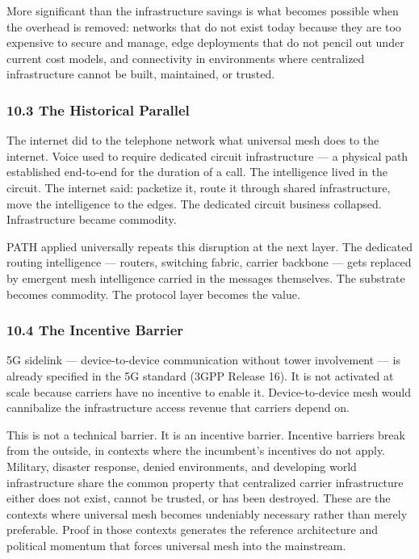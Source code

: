 \documentclass[
  11pt,
]{article}
\begin{document}
More significant than the infrastructure savings is what becomes
possible when the overhead is removed: networks that do not exist today
because they are too expensive to secure and manage, edge deployments
that do not pencil out under current cost models, and connectivity in
environments where centralized infrastructure cannot be built,
maintained, or trusted.

\hypertarget{the-historical-parallel}{%
\subsubsection{10.3 The Historical
Parallel}\label{the-historical-parallel}}

The internet did to the telephone network what universal mesh does to
the internet. Voice used to require dedicated circuit infrastructure ---
a physical path established end-to-end for the duration of a call. The
intelligence lived in the circuit. The internet said: packetize it,
route it through shared infrastructure, move the intelligence to the
edges. The dedicated circuit business collapsed. Infrastructure became
commodity.

PATH applied universally repeats this disruption at the next layer. The
dedicated routing intelligence --- routers, switching fabric, carrier
backbone --- gets replaced by emergent mesh intelligence carried in the
messages themselves. The substrate becomes commodity. The protocol layer
becomes the value.

\hypertarget{the-incentive-barrier}{%
\subsubsection{10.4 The Incentive Barrier}\label{the-incentive-barrier}}

5G sidelink --- device-to-device communication without tower involvement
--- is already specified in the 5G standard (3GPP Release 16). It is not
activated at scale because carriers have no incentive to enable it.
Device-to-device mesh would cannibalize the infrastructure access
revenue that carriers depend on.

This is not a technical barrier. It is an incentive barrier. Incentive
barriers break from the outside, in contexts where the incumbent's
incentives do not apply. Military, disaster response, denied
environments, and developing world infrastructure share the common
property that centralized carrier infrastructure either does not exist,
cannot be trusted, or has been destroyed. These are the contexts where
universal mesh becomes undeniably necessary rather than merely
preferable. Proof in those contexts generates the reference architecture
and political momentum that forces universal mesh into the mainstream.
\end{document}
